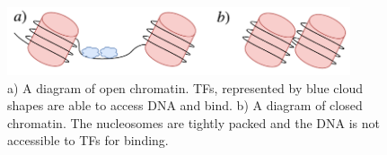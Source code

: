         \begin{figure}[H]
            \centering
            \includegraphics[width=0.9\textwidth]{OpenCloseChromatin.pdf}
            \caption{a) A diagram of open chromatin. TFs, represented by blue cloud shapes are able to access DNA and bind. b) A diagram of closed chromatin. The nucleosomes are tightly packed and the DNA is not accessible to TFs for binding.}
            \label{fig:openclose}
        \end{figure}
        

        


        
        
        
